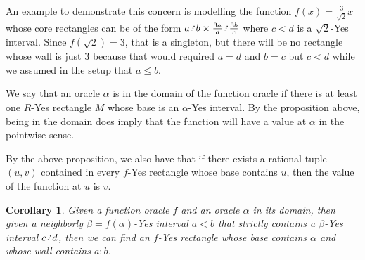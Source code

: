 \documentclass[12pt]{article}
\newtheorem{corollary}{Corollary}[section]
\begin{document}
An example to demonstrate this concern is modelling the function $f(x) = \frac{3}{\sqrt{2}}x$ whose core rectangles can be of the form $a\lte b \times \frac{3a}{d} \lte \frac{3b}{c}$ where $c\lt d$ is a $\sqrt{2}$-Yes interval.  Since $f(\sqrt{2}) = 3$, that is a singleton, but there will be no rectangle whose wall is just $3$ because that would required $a=d$ and $b=c$ but $c < d$ while we assumed in the setup that $a \leq b$. 

We say that an oracle $\alpha$ is in the domain of the function oracle if there is at least one $R$-Yes rectangle $M$ whose base is an $\alpha$-Yes interval. By the proposition above, being in the domain does imply that the function will have a value at $\alpha$ in the pointwise sense. 

By the above proposition, we also have that if there exists a rational tuple $(u,v)$ contained in every $f$-Yes rectangle whose base contains $u$, then the value of the function at $u$ is $v$.


\begin{corollary}\label{cor:wallorac}
    Given a function oracle $f$ and an oracle $\alpha$ in its domain, then given a neighborly $\beta=f(\alpha)$-Yes interval $a\lt b$ that strictly contains a $\beta$-Yes interval $c \lte d$, then we can find an $f$-Yes rectangle whose base contains $\alpha$ and whose wall contains $a:b$.
\end{corollary}
\end{document}
